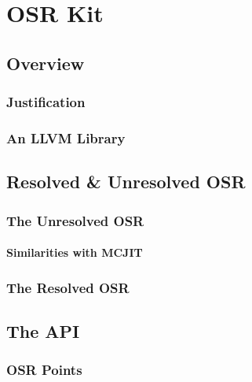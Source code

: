 
\chapter{OSR Kit} %

\label{Chapter4} %


\newcommand{\keyword}[1]{\textbf{#1}}
\newcommand{\tabhead}[1]{\textbf{#1}}
\newcommand{\code}[1]{\texttt{#1}}
\newcommand{\file}[1]{\texttt{\bfseries#1}}
\newcommand{\option}[1]{\texttt{\itshape#1}}

\section{Overview}
\subsection{Justification}
\subsection{An LLVM Library}

\section{Resolved \& Unresolved OSR}
\subsection{The Unresolved OSR}
\subsubsection{Similarities with MCJIT}
\subsection{The Resolved OSR}

\section{The API}
\subsection{OSR Points}

